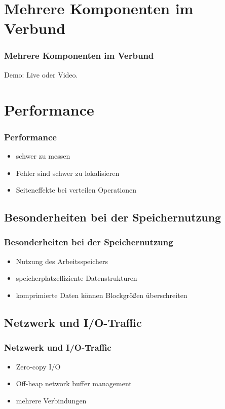 \documentclass[hyperref={pdfpagelabels=false}]{beamer}
\begin{document}
\section{Mehrere Komponenten im Verbund}
\begin{frame} 
\frametitle{Mehrere Komponenten im Verbund}

Demo: Live oder Video.

\end{frame}


\section{Performance}
\begin{frame} 
\frametitle{Performance}

\begin{itemize}
	\item schwer zu messen
	\item Fehler sind schwer zu lokalisieren
	\item Seiteneffekte bei verteilen Operationen	
\end{itemize}

\end{frame}

 \subsection{Besonderheiten bei der Speichernutzung}
\begin{frame} 
\frametitle{Besonderheiten bei der Speichernutzung}

\begin{itemize}
	\item Nutzung des Arbeitsspeichers
	\item speicherplatzeffiziente Datenstrukturen
	\item komprimierte Daten können Blockgrößen überschreiten	
\end{itemize}

\end{frame}

 \subsection{Netzwerk und I/O-Traffic}
\begin{frame} 
\frametitle{Netzwerk und I/O-Traffic}

\begin{itemize}
	\item Zero-copy I/O
	\item Off-heap network buffer management
	\item mehrere Verbindungen	
\end{itemize}

\end{frame}
\end{document}
